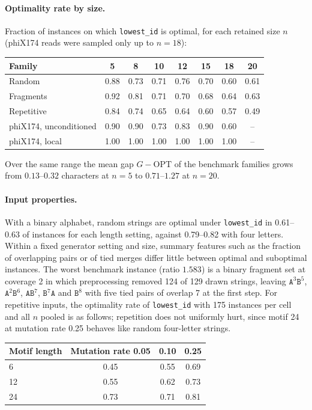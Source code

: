 \documentclass[11pt,a4paper]{article}   %
\theoremstyle{compact}
\theoremstyle{compactdef}
\newcommand{\OPT}{\mathrm{OPT}}
\newcommand{\GR}{G}                         %
\newcommand{\str}[1]{\texttt{#1}}           %
\begin{document}
\paragraph{Optimality rate by size.} Fraction of instances on which
\texttt{lowest\_id} is optimal, for each retained size $n$ (phiX174 reads
were sampled only up to $n=18$):
\begin{center}\small
\begin{tabular}{lccccccc}
\toprule
Family & 5 & 8 & 10 & 12 & 15 & 18 & 20\\
\midrule
Random & 0.88 & 0.73 & 0.71 & 0.76 & 0.70 & 0.60 & 0.61\\
Fragments & 0.92 & 0.81 & 0.71 & 0.70 & 0.68 & 0.64 & 0.63\\
Repetitive & 0.84 & 0.74 & 0.65 & 0.64 & 0.60 & 0.57 & 0.49\\
phiX174, unconditioned & 0.90 & 0.90 & 0.73 & 0.83 & 0.90 & 0.60 & --\\
phiX174, local & 1.00 & 1.00 & 1.00 & 1.00 & 1.00 & 1.00 & --\\
\bottomrule
\end{tabular}
\end{center}
Over the same range the mean gap $\GR-\OPT$ of the benchmark families grows
from $0.13$--$0.32$ characters at $n=5$ to $0.71$--$1.27$ at $n=20$.

\paragraph{Input properties.} With a binary alphabet, random strings are
optimal under \texttt{lowest\_id} in 0.61--0.63 of instances for each length
setting, against 0.79--0.82 with four letters. Within a fixed generator
setting and size, summary features such as the fraction of overlapping pairs
or of tied merges differ little between optimal and suboptimal instances.
The worst benchmark instance (ratio $1.583$) is a binary fragment set at
coverage 2 in which preprocessing removed 124 of 129 drawn strings, leaving
$\str{A}^3\str{B}^5$, $\str{A}^2\str{B}^6$, $\str{AB}^7$, $\str{B}^7\str{A}$
and $\str{B}^8$ with five tied pairs of overlap 7 at the first step. For
repetitive inputs, the optimality rate of \texttt{lowest\_id} with 175
instances per cell and all $n$ pooled is as follows; repetition does not
uniformly hurt, since motif 24 at mutation rate 0.25 behaves like random
four-letter strings.
\begin{center}\small
\begin{tabular}{lccc}
\toprule
Motif length & Mutation rate 0.05 & 0.10 & 0.25\\
\midrule
6 & 0.45 & 0.55 & 0.69\\
12 & 0.55 & 0.62 & 0.73\\
24 & 0.73 & 0.71 & 0.81\\
\bottomrule
\end{tabular}
\end{center}
\end{document}
